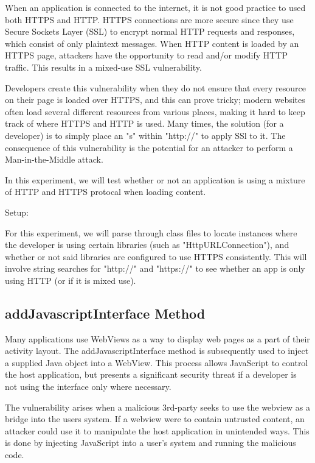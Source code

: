         When an application is connected to the internet, it is not 
        good practice to used both HTTPS and HTTP. HTTPS connections 
        are more secure since they use Secure Sockets Layer (SSL) to 
        encrypt normal HTTP requests and responses, which consist of 
        only plaintext messages. When HTTP content is loaded by an 
        HTTPS page, attackers have the opportunity to read and/or modify
        HTTP traffic. This results in a mixed-use SSL vulnerability.

        Developers create this vulnerability when they do not ensure 
        that every resource on their page is loaded over HTTPS, and 
        this can prove tricky; modern websites often load several 
        different resources from various places, making it hard to 
        keep track of where HTTPS and HTTP is used. Many times, the 
        solution (for a developer) is to simply place an "s" within 
        "http://" to apply SSl to it. The consequence of this vulnerability 
        is the potential for an attacker to perform a Man-in-the-Middle 
        attack.

        In this experiment, we will test whether or not an application is 
        using a mixture of HTTP and HTTPS protocal when loading content.

        Setup:

        For this experiment, we will parse through class files to locate
        instances where the developer is using certain libraries (such as 
        "HttpURLConnection"), and whether or not said libraries are configured
        to use HTTPS consistently. This will involve string searches for 
        "http://" and "https://" to see whether an app is only using HTTP (or
        if it is mixed use).

    \subsection{addJavascriptInterface Method}

        Many applications use WebViews as a way to display web pages as a 
        part of their activity layout. The addJavascriptInterface method 
        is subsequently used to inject a supplied Java object into a WebView. 
        This process allows JavaScript to control the host application, 
        but presents a significant security threat if a developer is not 
        using the interface only where necessary. 

        The vulnerability arises when a malicious 3rd-party seeks to use 
        the webview as a bridge into the users system. If a webview were to
        contain untrusted content, an attacker could use it to manipulate the
        host application in unintended ways. This is done by injecting JavaScript 
        into a user's system and running the malicious code.
        
